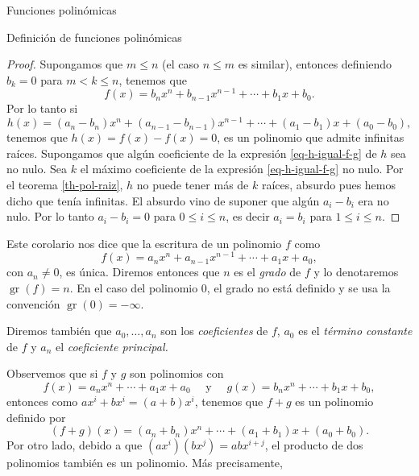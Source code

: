 \begin{chapter}{Funciones polin\'omicas}
\begin{section}{Definici\'on de funciones polin\'omicas}
\begin{proof}
            Supongamos que $m \le n$ (el caso $n \le m$ es similar), entonces definiendo $b_k=0$ para $m < k \le n$, tenemos que
            \begin{equation*}
            f(x) = b_nx^n + b_{n-1}x^{n-1}+\cdots + b_1x +b_0.
            \end{equation*}
            Por lo tanto si 
            \begin{equation}\label{eq-h-igual-f-g}
                h(x) = (a_n- b_n)x^n + (a_{n-1}-b_{n-1})x^{n-1}+\cdots + (a_{1}-b_{1})x +(a_{0}-b_{0}), 
            \end{equation}
            tenemos  que $h(x)= f(x)-f(x)=0$,  es un polinomio que admite infinitas raíces. 
            Supongamos  que algún coeficiente de la expresión \eqref{eq-h-igual-f-g} de $h$ sea no nulo. Sea $k$  el máximo coeficiente de la expresión \eqref{eq-h-igual-f-g} no nulo. Por el teorema   \ref{th-pol-raiz}, $h$ no  puede tener más de $k$ raíces, absurdo pues hemos dicho que tenía infinitas. El absurdo vino de suponer que algún $a_i-b_i$ era no nulo. Por lo tanto $a_i -b_i=0$ para $0 \le i \le n$,  es decir $a_i=b_i$ para $1 \le i \le n$. 
            
            
        \end{proof}
    
        Este corolario nos dice que la escritura de un polinomio $f$ como 
        \begin{equation*}
        f(x) = a_nx^n + a_{n-1}x^{n-1}+\cdots + a_1x +a_0,
        \end{equation*}
        con $a_n \ne 0$, es única. Diremos entonces que $n$ es el  \textit{grado} de $f$ y lo denotaremos $\operatorname{gr}(f)=n$. En  el caso del polinomio 0, el grado no está definido y se usa la convención $\operatorname{gr}(0)=-\infty$. 
        
        Diremos también que  $a_0,\ldots,a_n$ son los \textit{coeficientes} de $f$, $a_0$ es el \textit{término constante} de $f$ y $a_n$  el \textit{coeficiente principal.} 
    
        Observemos que si $f$ y $g$ son polinomios con   
        \begin{equation*}
        f(x) = a_nx^n + \cdots + a_1x +a_0 \quad\text{ y } \quad g(x) = b_nx^n +\cdots + b_1x +b_0,
        \end{equation*}
        entonces como $ax^i + b x^i = (a+b)x^i$, tenemos que $f+g$ es un polinomio definido por 
        \begin{equation*}
        (f + g)(x) = (a_n+b_n)x^n + \cdots + (a_1+b_1)x +(a_0+b_0).
        \end{equation*}
        Por otro  lado,  debido  a que $(ax^i)(bx^j) = abx^{i+j}$, el producto de dos polinomios también es un polinomio. Más precisamente,
        

\end{section}
\end{chapter}
